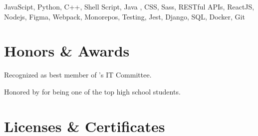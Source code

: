 \documentclass[legalpaper, oneside, final]{scrartcl}
\begin{document}
\begin{center}
%
%

\parbox{\linewidth} {
JavaScipt, Python, C++, Shell Script, Java , CSS, Sass, RESTful APIs, ReactJS, Nodejs, Figma, Webpack, Monorepos, Testing, Jest, Django, SQL, Docker, Git
}


\section{Honors \& Awards}

\begin{datelist}
    {Recognized as best member of 's IT Committee.}

    {Honored by  for being one of the top high school students.}
\end{datelist}



\section{Licenses \& Certificates}


\end{center}
\end{document}
